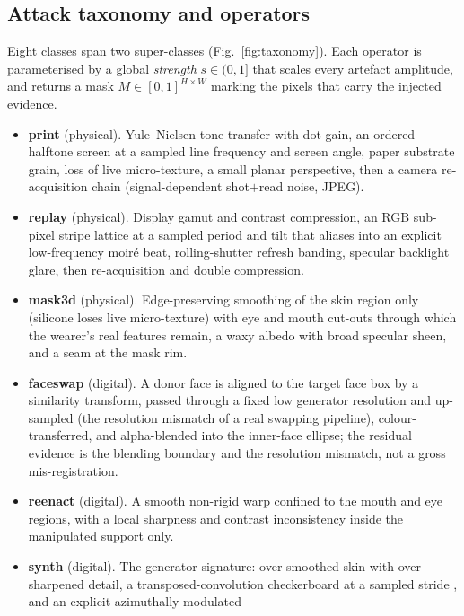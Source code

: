 \documentclass[conference]{IEEEtran}
\begin{document}
\subsection{Attack taxonomy and operators}
Eight classes span two super-classes (Fig.~\ref{fig:taxonomy}). Each operator is
parameterised by a global \emph{strength} $s\in(0,1]$ that scales every artefact
amplitude, and returns a mask $M\in[0,1]^{H\times W}$ marking the pixels that carry
the injected evidence.

\begin{itemize}
\item \textbf{print} (physical). Yule--Nielsen tone transfer with dot gain, an
      ordered halftone screen at a sampled line frequency and screen angle, paper
      substrate grain, loss of live micro-texture, a small planar perspective, then
      a camera re-acquisition chain (signal-dependent shot$+$read noise, JPEG).
\item \textbf{replay} (physical). Display gamut and contrast compression, an RGB
      sub-pixel stripe lattice at a sampled period and tilt that aliases into an
      explicit low-frequency moir\'e beat, rolling-shutter refresh banding,
      specular backlight glare, then re-acquisition and double compression.
\item \textbf{mask3d} (physical). Edge-preserving smoothing of the skin region only
      (silicone loses live micro-texture) with eye and mouth cut-outs through which
      the wearer's real features remain, a waxy albedo with broad specular sheen,
      and a seam at the mask rim.
\item \textbf{faceswap} (digital). A donor face is aligned to the target face box by
      a similarity transform, passed through a fixed low generator resolution and
      up-sampled (the resolution mismatch of a real swapping pipeline),
      colour-transferred, and alpha-blended into the inner-face ellipse; the
      residual evidence is the blending boundary and the resolution mismatch, not a
      gross mis-registration.
\item \textbf{reenact} (digital). A smooth non-rigid warp confined to the mouth and
      eye regions, with a local sharpness and contrast inconsistency inside the
      manipulated support only.
\item \textbf{synth} (digital). The generator signature: over-smoothed skin with
      over-sharpened detail, a transposed-convolution checkerboard at a sampled
      stride \cite{odena2016checkerboard}, and an explicit azimuthally modulated

\end{itemize}
\end{document}
